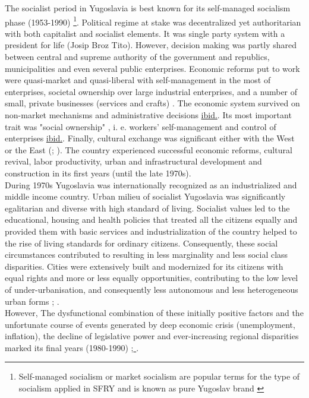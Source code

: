 \documentclass[11pt]{report}
\begin{document}
The socialist period in Yugoslavia is best known for its self-managed socialism phase (1953-1990) \footnote{Self-managed socialism or market socialism are popular terms for the type of socialism applied in SFRY and is known as pure Yugoslav brand \href{}{\citealt{estrin_yugoslavia:_1991}}}. Political regime at stake was decentralized yet authoritarian with both capitalist and socialist elements. It was single party system with a president for life (Josip Broz Tito).
However, decision making was partly shared between central and supreme authority of the government and republics, municipalities and even several public enterprises.
Economic reforms put to work were quasi-market and quasi-liberal with self-management in the most of enterprises, societal ownership over large industrial enterprises, and a number of small, private businesses (services and crafts) \href{}{\citealt{estrin_yugoslavia:_1991}}.
The economic system survived on non-market mechanisms and administrative decisions \href{}{ibid.}.
Its most important trait was "social  ownership" , i. e.  workers' self-management and control of  enterprises \href{}{ibid.}. Finally, cultural exchange was significant either with the West or the East (\href{}{\citealt{hirt_belgrade_2009}}; \href{}{\citealt{vujosevic_conundrum_2012}}).
The country experienced successful economic reforms, cultural revival, labor productivity, urban and infrastructural development and construction in its first years (until the late 1970s).
\\

During 1970s Yugoslavia was internationally recognized as an industrialized and middle income country. 
Urban milieu of socialist Yugoslavia was significantly egalitarian and diverse with high standard of living.
Socialist values led to the educational, housing and health policies that treated all the citizens equally and provided them with basic services and industrialization of the country helped to the rise of living standards for ordinary citizens.
Consequently, these social circumstances contributed to  resulting in less marginality and less social class disparities. 
Cities were extensively built and modernized for its citizens with equal rights and more or less equally opportunities, contributing to the low level of under-urbanisation, and consequently less autonomous and less heterogeneous urban forms \href{}{\citealt{vujovic_belgrades_2007}}; \href{}{\citealt{stanek_urban_2014}}.
\\

However, The dysfunctional combination of these initially positive factors and the unfortunate course of events generated by deep economic crisis (unemployment, inflation), the decline of legislative power and ever-increasing regional disparities marked its final years (1980-1990) \href{}{\citealt{estrin_yugoslavia:_1991}};\href{}{ \citealt{stambolieva_welfare_2013}}.
\\
\end{document}
